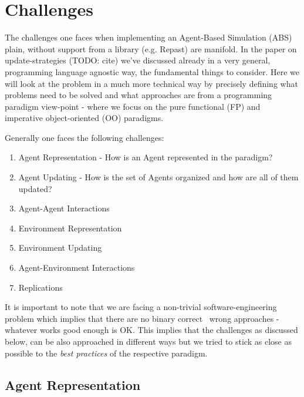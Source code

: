 \chapter{Challenges}

The challenges one faces when implementing an Agent-Based Simulation (ABS) plain, without support from a library (e.g. Repast) are manifold. In the paper on update-strategies (TODO: cite) we've discussed already in a very general, programming language agnostic way, the fundamental things to consider. Here we will look at the problem in a much more technical way by precisely defining what problems need to be solved and what approaches are from a programming paradigm view-point - where we focus on the pure functional (FP) and imperative object-oriented (OO) paradigms.

Generally one faces the following challenges:

\begin{enumerate}
	\item Agent Representation - How is an Agent represented in the paradigm?
	\item Agent Updating - How is the set of Agents organized and how are all of them updated?
	\item Agent-Agent Interactions 
	\item Environment Representation
	\item Environment Updating
	\item Agent-Environment Interactions
	\item Replications
\end{enumerate}

It is important to note that we are facing a non-trivial software-engineering problem which implies that there are no binary correct \ wrong approaches - whatever works good enough is OK. This implies that the challenges as discussed below, can be also approached in different ways but we tried to stick as close as possible to the \textit{best practices} of the respective paradigm.

\section{Agent Representation}
